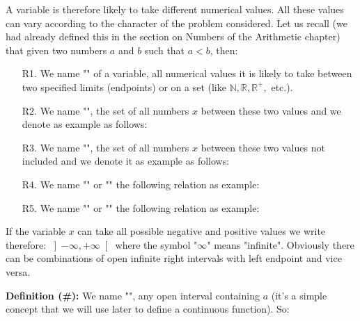 	A variable is therefore likely to take different numerical values. All these values can vary according to the character of the problem considered. Let us recall (we had already defined this in the section on Numbers of the Arithmetic chapter) that given two numbers $a$ and $b$ such that $a<b$, then:

\begin{enumerate}
	\item[R1.] We name "" of a variable, all numerical values it is likely to take between two specified limits (endpoints) or on a set (like $\mathbb{N}, \mathbb{R},\mathbb{R}^+,$ etc.).
	
	\item[R2.] We name "", the set of all numbers $x$ between these two values and we denote as example as follows:
	
	
	\item[R3.] We name "", the set of all numbers $x$ between these two values not included and we denote it as example as follows:
	
	
	\item[R4.] We name "" or "" the following relation as example:
	
	
	\item[R5.] We name "" or "" the following relation as example:
	
\end{enumerate}

	\begin{tcolorbox}[title=Remark,colframe=black,arc=10pt]
If the variable $x$ can take all possible negative and positive values we write therefore: $\left] -\infty,+\infty \right[$ where the symbol "$\infty$" means "infinite". Obviously there can be combinations of open infinite right intervals with left endpoint and vice versa.
	\end{tcolorbox}	

\textbf{Definition (\#\mydef):} We name "", any open interval containing $a$ (it's a simple concept that we will use later to define a continuous function). So:
	
